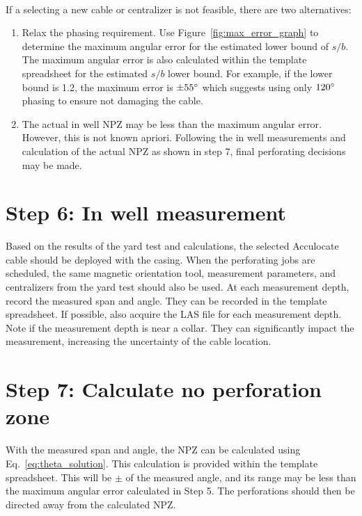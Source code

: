 \documentclass[paper=a4, fontsize=11pt]{scrartcl}
\numberwithin{equation}{section}		%
\numberwithin{figure}{section}			%
\numberwithin{table}{section}				%
\begin{document}
\paragraph{}
If a selecting a new cable or centralizer is not feasible, there are two alternatives: 
\begin{enumerate}
    \item Relax the phasing requirement.  Use Figure~\ref{fig:max_error_graph} to determine the maximum angular error for the estimated lower bound of $s/b$.  The maximum angular error is also calculated within the template spreadsheet for the estimated $s/b$ lower bound.  For example, if the lower bound is 1.2, the maximum error is $\pm55\degree$ which suggests using only $120\degree$ phasing to ensure not damaging the cable.
    \item The actual in well NPZ may be less than the maximum angular error.  However, this is not known apriori.  Following the in well measurements and calculation of the actual NPZ as shown in step 7, final perforating decisions may be made.  
\end{enumerate}

\section{Step 6: In well measurement}\label{section:step_6}
Based on the results of the yard test and calculations, the selected Acculocate cable should be deployed with the casing.  When the perforating jobs are scheduled, the same magnetic orientation tool, measurement parameters, and centralizers from the yard test should also be used.  At each measurement depth, record the measured span and angle.  They can be recorded in the template spreadsheet.  If possible, also acquire the LAS file for each measurement depth.  Note if the measurement depth is near a collar.  They can significantly impact the measurement, increasing the uncertainty of the cable location.  

\section{Step 7: Calculate no perforation zone}\label{section:step_7}
With the measured span and angle, the NPZ can be calculated using Eq.~\ref{eq:theta_solution}.  This calculation is provided within the template spreadsheet.  This will be $\pm$ of the measured angle, and its range may be less than the maximum angular error calculated in Step 5.  The perforations should then be directed away from the calculated NPZ. 
\end{document}
